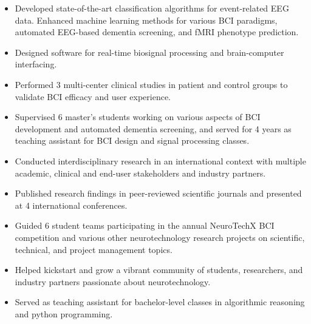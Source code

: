 \documentclass{resume}
\begin{document}
\begin{itemize}
	\item Developed state-of-the-art classification algorithms for event-related
	      EEG data. Enhanced machine learning methods for various BCI
	      paradigms, automated EEG-based dementia screening, and fMRI phenotype prediction.
	\item Designed software for real-time bio\-signal processing and
	      brain-computer interfacing.
	\item Performed 3 multi-center clinical studies in patient and control
	      groups to validate BCI efficacy and user experience.
	\item Supervised 6 master's students working on various aspects of BCI development
	      and automated dementia screening, and served for 4 years as teaching assistant
	      for BCI design and signal processing classes.
	\item Conducted interdisciplinary research in an international context with
	      multiple academic, clinical and end-user stakeholders and industry partners.
	\item Published research findings in peer-reviewed scientific journals and presented at
	      4 international conferences.

\end{itemize}
\bigskip

\begin{itemize}
	\item Guided 6 student teams participating in the annual Neuro\-TechX BCI
	      competition and various other neurotechnology research projects
	      on scientific, technical, and project management topics.
	\item Helped kick\-start and grow a vibrant community of students, researchers,
	      and industry partners passionate about neuro\-technology.
\end{itemize}
\bigskip

\begin{itemize}
	\item Served as teaching assistant for bachelor-level classes in algorithmic reasoning and python programming.
\end{itemize}
\bigskip

\end{document}

